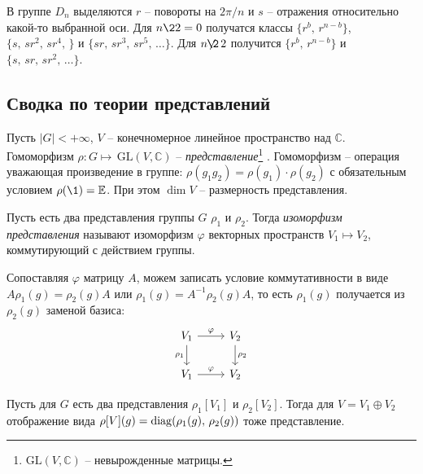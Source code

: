 В группе $D_n$ выделяются $r$ -- повороты на ${2\pi}/{n}$ и $s$ -- отражения относительно какой-то выбранной оси. Для $n \2 2 = 0$ получатся классы $\{r^b,\,  r^{n-b}\}$, $\{s,\,  s r^2,\, s r^4,\, \}$ и $\{s r,\, s r^3,\, s r^5,\, \ldots\}$. Для $n \hspace{-2pt}\not{\hspace{-4pt}\2}\, 2$ получится $\{r^b,\, r^{n-b}\}$ и $\{s,\, s r,\,  sr^2,\, \ldots\}$. 



\subsection{Сводка по теории представлений}

\begin{to_def}
    Пусть $|G|  < + \infty$, $V$ -- конечномерное линейное пространство над $\mathbb{C}$. Гомоморфизм $\rho\colon G \mapsto \,\text{GL}(V, \mathbb{C})$ -- \textit{представление}\footnote{
    	$\text{GL}(V, \mathbb{C})$ -- невырожденные матрицы. 
    } .	 Гомоморфизм -- операция уважающая произведение в группе: $\rho(g_1 g_2) = \rho(g_1) \cdot \rho(g_2)$ с обязательным условием $\rho(\1) = \mathbb{E}$. При этом $\dim V$ -- размерность представления. 
\end{to_def}


\begin{to_def}
    Пусть есть два представления группы $G$ $\rho_1$ и $\rho_2$. Тогда
    \textit{изоморфизм представления} называют изоморфизм $\varphi$ векторных пространств $V_1 \mapsto V_2$, коммутирующий с действием группы.
\end{to_def}

Сопоставляя $\varphi$ матрицу $A$, можем записать  условие коммутативности в виде $A \rho_1 (g) = \rho_2 (g) A$ или $\rho_1 (g) = A^{-1} \rho_2 (g) A$, то есть $\rho_1 (g)$ получается из $\rho_2 (g)$ заменой базиса:
\begin{equation*}
	\begin{tikzcd}[column sep=normal,row sep=normal]
	V_1 \arrow[r,"\varphi"] \arrow[d,swap,"\rho_1"] & V_2 \arrow[d,"\rho_2"] \\
	V_1 \arrow[r, "\varphi"] & V_2 
	\end{tikzcd}
\end{equation*}



\begin{to_def}
    Пусть для $G$ есть два представления $\rho_1[V_1]$ и $\rho_2[V_2]$. Тогда для $V = V_1 \oplus V_2$ отображение вида $\rho[V](g)  = \mathop{\mathrm{diag}}\nolimits(\rho_1(g),\, \rho_2(g))$ тоже представление. 
\end{to_def}


